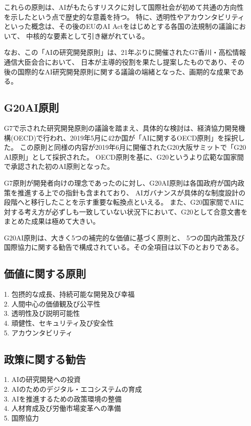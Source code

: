 これらの原則は、AIがもたらすリスクに対して国際社会が初めて共通の方向性を示したという点で歴史的な意義を持つ。
特に、透明性やアカウンタビリティといった概念は、その後のEUのAI Actをはじめとする各国の法規制の議論において、
中核的な要素として引き継がれている。

なお、この「AIの研究開発原則」は、21年ぶりに開催されたG7香川・高松情報通信大臣会合において、
日本が主導的役割を果たし提案したものであり、その後の国際的なAI研究開発原則に関する議論の端緒となった、画期的な成果である。


\subsection{G20AI原則}
G7で示された研究開発原則の議論を踏まえ、具体的な検討は、経済協力開発機構(OECD)で行われ、2019年5月に42か国が「AIに関するOECD原則」を採択した。
この原則と同様の内容が2019年6月に開催されたG20大阪サミットで「G20 AI原則」として採択された。
OECD原則を基に、G20というより広範な国家間で承認された初のAI原則となった。

G7原則が開発者向けの理念であったのに対し、G20AI原則は各国政府が国内政策を推進する上での指針も含まれており、
AIガバナンスが具体的な制度設計の段階へと移行したことを示す重要な転換点といえる。
また、G20国家間でAIに対する考え方が必ずしも一致していない状況下において、G20として合意文書をまとめた成果は極めて大きい。

G20AI原則は、大きく5つの補完的な価値に基づく原則と、
5つの国内政策及び国際協力に関する勧告で構成されている。その全項目は以下のとおりである。

\subsection*{価値に関する原則} %
\begin{description}
  \item[1. 包摂的な成長、持続可能な開発及び幸福]
  \item[2. 人間中心の価値観及び公平性]
  \item[3. 透明性及び説明可能性]
  \item[4. 頑健性、セキュリティ及び安全性]
  \item[5. アカウンタビリティ]
\end{description}

\subsection*{政策に関する勧告}
\begin{description}
  \item[1. AIの研究開発への投資]
  \item[2. AIのためのデジタル・エコシステムの育成]
  \item[3. AIを推進するための政策環境の整備]
  \item[4. 人材育成及び労働市場変革への準備]
  \item[5. 国際協力]
\end{description}

